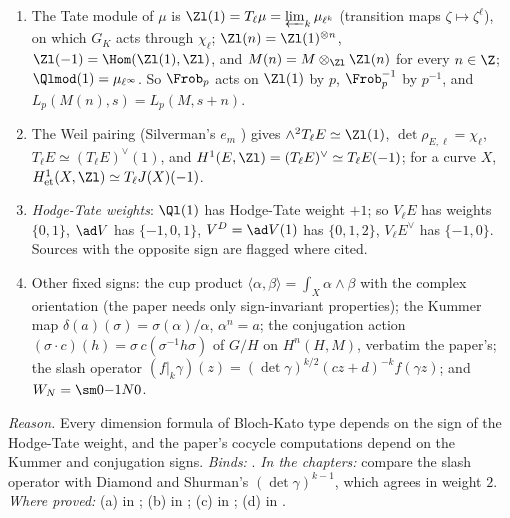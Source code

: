 \begin{convention}\label{conv:notation:bc5}
\leavevmode
\begin{enumerate}[label=(\alph*)]
\item The Tate module of $\mu$ is $\Zl(1)=T_\ell\mu=\varprojlim_k\mu_{\ell^k}$ (transition maps $\zeta\mapsto\zeta^\ell$), on which $G_K$ acts through $\chi_\ell$;
$\Zl(n)=\Zl(1)^{\otimes n}$, $\Zl(-1)=\Hom(\Zl(1),\Zl)$, and $M(n)=M\otimes_{\Zl}\Zl(n)$ for every $n\in\Z$; $\Qlmod(1)=\mu_{\ell^\infty}$. So $\Frob_p$
acts on $\Zl(1)$ by $p$, $\Frob_p^{-1}$ by $p^{-1}$, and $L_p(M(n),s)=L_p(M,s+n)$.
\item The Weil pairing (Silverman's $e_m$ \cite[III.8]{SilvermanAEC}) gives $\wedge^2T_\ell E\simeq\Zl(1)$, $\det\rho_{E,\ell}=\chi_\ell$,
$T_\ell E\simeq(T_\ell E)^\vee(1)$, and $H^1(E,\Zl)=(T_\ell E)^\vee\simeq T_\ell E(-1)$; for a curve $X$, $H^1_{\mathrm{et}}(X,\Zl)\simeq T_\ell J(X)(-1)$.
\item \emph{Hodge-Tate weights}: $\Ql(1)$ has Hodge-Tate weight $+1$; so $V_\ell E$ has weights $\{0,1\}$, $\ad V$ has $\{-1,0,1\}$,
$V^D=\ad V(1)$ has $\{0,1,2\}$, $V_\ell E^\vee$ has $\{-1,0\}$. Sources with the opposite sign are flagged where cited.
\item Other fixed signs: the cup product $\langle\alpha,\beta\rangle=\int_X\alpha\wedge\beta$ with the complex orientation (the paper
needs only sign-invariant properties); the Kummer map $\delta(a)(\sigma)=\sigma(\alpha)/\alpha$, $\alpha^n=a$; the conjugation action
$(\sigma\cdot c)(h)=\sigma\,c(\sigma^{-1}h\sigma)$ of $G/H$ on $H^n(H,M)$, verbatim the paper's; the slash operator
$(f|_k\gamma)(z)=(\det\gamma)^{k/2}(cz+d)^{-k}f(\gamma z)$; and $W_N=\sm0{-1}N0$.
\end{enumerate}
\end{convention}

\noindent\emph{Reason.} Every dimension formula of Bloch-Kato type depends on the sign of the Hodge-Tate weight, and the paper's
cocycle computations depend on the Kummer and conjugation signs. \emph{Binds:}
.
\emph{In the chapters:}  compare the slash operator with Diamond and Shurman's
$(\det\gamma)^{k-1}$, which agrees in weight $2$. \emph{Where proved:} (a) in ; (b) in
; (c) in ; (d) in .

